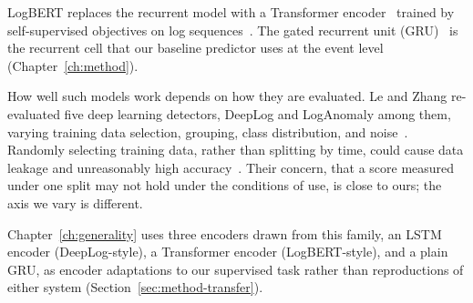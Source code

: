 LogBERT replaces the recurrent model with a
Transformer encoder~\cite{vaswani2017attention} trained by self-supervised
objectives on log sequences~\cite{guo2021logbert}.
The gated recurrent unit
(GRU)~\cite{cho2014gru} is the recurrent cell that our baseline
predictor uses at the event level (Chapter~\ref{ch:method}).

How well such models work depends on how they are evaluated. Le and
Zhang re-evaluated five deep learning detectors, DeepLog and LogAnomaly
among them, varying training data selection, grouping, class
distribution, and noise~\cite{le2022log}.
Randomly selecting training data, rather than splitting by time, could
cause data leakage and unreasonably high accuracy~\cite{le2022log}.
Their concern, that a score measured under one split may not hold
under the conditions of use, is close to ours; the axis we vary is
different.

Chapter~\ref{ch:generality} uses three encoders drawn from this
family, an LSTM encoder (DeepLog-style), a Transformer encoder
(LogBERT-style), and a plain GRU, as encoder adaptations to our
supervised task rather than reproductions of either system
(Section~\ref{sec:method-transfer}).

